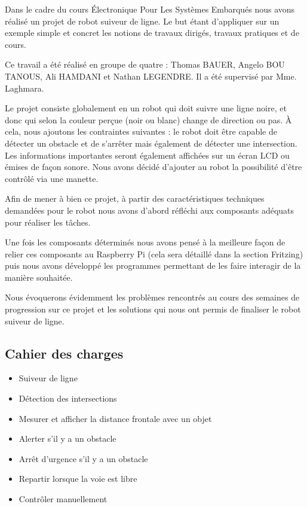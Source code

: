 Dans le cadre du cours Électronique Pour Les Systèmes Embarqués nous avons réalisé un projet de robot suiveur de ligne. Le but étant d'appliquer sur un exemple simple et concret les notions de travaux dirigés, travaux pratiques et de cours.

Ce travail a été réalisé en groupe de quatre : Thomas BAUER, Angelo BOU TANOUS, Ali HAMDANI et Nathan LEGENDRE. Il a été supervisé par Mme. Laghmara.

Le projet consiste globalement en un robot qui doit suivre une ligne noire, et donc qui selon la couleur perçue (noir ou blanc) change de direction ou pas. À cela, nous ajoutons les contraintes suivantes : le robot doit être capable de détecter un obstacle et de s'arrêter mais également de détecter une intersection. Les informations importantes seront également affichées sur un écran LCD ou émises de façon sonore. Nous avons décidé d'ajouter au robot la possibilité d'être contrôlé via une manette.

Afin de mener à bien ce projet, à partir des caractéristiques techniques demandées pour le robot nous avons d'abord réfléchi aux composants adéquats pour réaliser les tâches.

Une fois les composants déterminés nous avons pensé à la meilleure façon de relier ces composants au Raspberry Pi (cela sera détaillé dans la section Fritzing) puis nous avons développé les programmes permettant de les faire interagir de la manière souhaitée.

Nous évoquerons évidemment les problèmes rencontrés au cours des semaines de progression sur ce projet et les solutions qui nous ont permis de finaliser le robot suiveur de ligne.

\subsection*{Cahier des charges}
\begin{itemize}
    \item Suiveur de ligne
    \item Détection des intersections
    \item Mesurer et afficher la distance frontale avec un objet
    \item Alerter s'il y a un obstacle
    \item Arrêt d'urgence s'il y a un obstacle
    \item Repartir lorsque la voie est libre
    \item Contrôler manuellement
\end{itemize}

\newpage